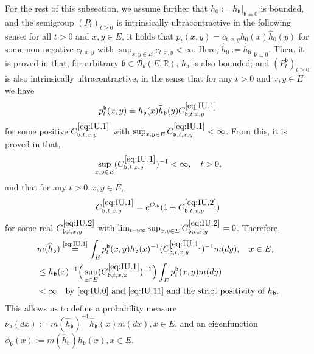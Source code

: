 \documentclass[12pt,a4paper]{amsart}
\numberwithin{equation}{section}
\theoremstyle{plain}
\theoremstyle{definition}
\theoremstyle{remark}
\begin{document}
	For the rest of this subsection, we assume further that $h_0:= h_\mathfrak b|_{\mathfrak{b} \equiv 0}$ is bounded, and the semigroup $(P_t)_{t\geq 0}$ is intrinsically ultracontractive in the following sense: for all $t>0$ and $x, y \in E$, it holds that $p_t(x,y) = c_{t,x,y} h_0(x) \widehat h_0(y)$ for some non-negative $c_{t,x,y}$ with $\sup_{x,y \in E} c_{t,x,y}< \infty$.
	Here, $\widehat h_0 := \widehat h_\mathfrak b|_{\mathfrak{b}\equiv 0}$.
	Then, it is proved in \cite{RenSongZhang2015Limit, RenSongZhang2017Central} that, for arbitrary $\mathfrak b \in \mathcal B_b(E,\mathbb R)$, $h_\mathfrak b$ is also bounded; and $(P_t^\mathfrak b)_{t\geq 0}$ is also intrinsically ultracontractive, in the sense that for any $t> 0$ and $x,y \in E$ we have
\begin{equation} \label{eq:IU.1}
	p^\mathfrak b_t(x,y)
	= h_\mathfrak b(x) \widehat h_\mathfrak b (y) C^{\eqref{eq:IU.1}}_{\mathfrak b,t,x,y}
\end{equation}
	for some positive $C^{\eqref{eq:IU.1}}_{\mathfrak b,t,x,y}$ with $\sup_{x,y \in E} C^{\eqref{eq:IU.1}}_{\mathfrak b,t,x,y}< \infty$.
	From this, it is proved in \cite{KimSong2008Intrinsic} that,
\begin{equation} \label{eq:IU.11}
	\sup_{x,y \in E} (C^{\eqref{eq:IU.1}}_{\mathfrak b,t,x,y})^{-1}
	< \infty,
	\quad t>0,
\end{equation}
	and that for any $t>0, x,y \in E$,
\begin{equation}\label{eq:IU.2}
	C^{\eqref{eq:IU.1}}_{\mathfrak b,t,x,y}
	= e^{t\lambda_\mathfrak{b}} (1+ C^{\eqref{eq:IU.2}}_{\mathfrak b,t,x,y})
\end{equation}
	for some real $C^{\eqref{eq:IU.2}}_{\mathfrak b,t,x,y}$ with $\lim_{t\to \infty} \sup_{x,y \in E} C^{\eqref{eq:IU.2}}_{\mathfrak b,t,x,y} =0$.
	Therefore,
\begin{align}
	& m(\widehat h_{\mathfrak b}) \overset{\text{\eqref{eq:IU.1}}}= \int_{E} p_t^\mathfrak{b}(x,y)h_\mathfrak{b}(x)^{-1} (C^{\eqref{eq:IU.1}}_{\mathfrak b,t,x,y})^{-1} m(dy), \quad x\in E,
	\\&\leq  h_\mathfrak{b}(x)^{-1} \Big(\sup_{z\in E}(C^{\eqref{eq:IU.1}}_{\mathfrak b,t,x,z})^{-1}\Big)  \int_{E} p_t^\mathfrak{b}(x,y)m(dy)
	\\& < \infty \quad\text{by \eqref{eq:IU.0} and \eqref{eq:IU.11} and the strict positivity of $h_\mathfrak{b}$}.
\end{align}
	This allows us to define a probability measure $\nu_\mathfrak b (dx):= m(\widehat h_{\mathfrak b})^{-1} \widehat h_\mathfrak b (x)m(dx), x\in E$, and an eigenfunction $\phi_\mathfrak{b}(x) := m(\widehat h_{\mathfrak b}) h_\mathfrak b(x), x\in E$.
\end{document}
